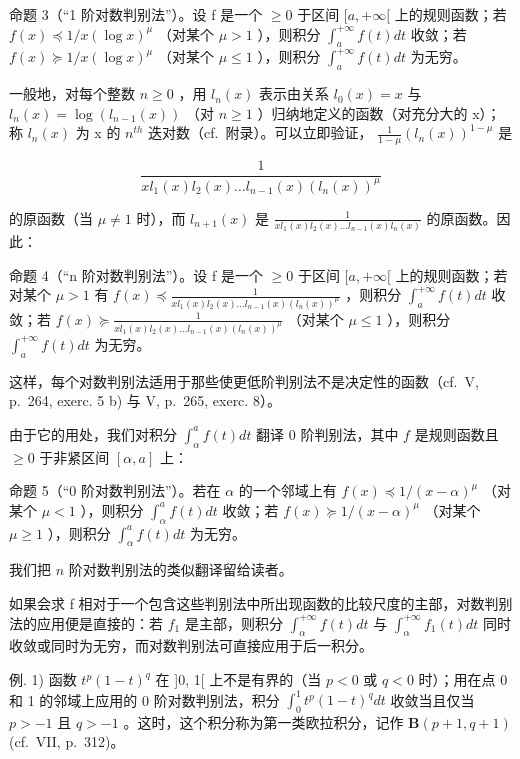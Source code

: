 命题 3（``1 阶对数判别法''）。设 f 是一个 \(\geqslant 0\) 于区间 \([a, +\infty[\) 上的规则函数；若 \(f(x) \preccurlyeq 1/x(\log x)^{\mu}\) （对某个 \(\mu > 1\) ），则积分 \(\int_{a}^{+\infty} f(t) dt\) 收敛；若 \(f(x) \succcurlyeq 1/x(\log x)^{\mu}\) （对某个 \(\mu \leqslant 1\) ），则积分 \(\int_{a}^{+\infty} f(t) dt\) 为无穷。

一般地，对每个整数 \(n \geqslant 0\) ，用 \(l_{n}(x)\) 表示由关系 \(l_{0}(x) = x\) 与 \(l_{n}(x) = \log(l_{n-1}(x))\) （对 \(n \geqslant 1\) ）归纳地定义的函数（对充分大的 x）；称 \(l_{n}(x)\) 为 x 的 \(n^{th}\) 迭对数（cf.~附录）。可以立即验证， \(\frac{1}{1 - \mu}\left(l_{n}(x)\right)^{1 - \mu}\) 是

\[
\frac {1}{x l _ {1} (x) l _ {2} (x) \dots l _ {n - 1} (x) \left(l _ {n} (x)\right) ^ {\mu}}
\]

的原函数（当 \(\mu \neq 1\) 时），而 \(l_{n+1}(x)\) 是 \(\frac{1}{xl_1(x)l_2(x)\ldots l_{n-1}(x)l_n(x)}\) 的原函数。因此：

命题 4（``n 阶对数判别法''）。设 f 是一个 \(\geqslant0\) 于区间 \([a,+\infty[\) 上的规则函数；若对某个 \(\mu>1\) 有 \(f(x)\preccurlyeq\frac{1}{xl_{1}(x)l_{2}(x)\ldots l_{n-1}(x)(l_{n}(x))^{\mu}}\) ，则积分 \(\int_{a}^{+\infty}f(t)dt\) 收敛；若 \(f(x)\succcurlyeq\frac{1}{xl_{1}(x)l_{2}(x)\ldots l_{n-1}(x)(l_{n}(x))^{\mu}}\) （对某个 \(\mu\leqslant1\) ），则积分 \(\int_{a}^{+\infty}f(t)dt\) 为无穷。

这样，每个对数判别法适用于那些使更低阶判别法不是决定性的函数（cf.~V, p.~264, exerc. 5 b) 与 V, p.~265, exerc. 8）。

由于它的用处，我们对积分 \(\int_{\alpha}^{a}f(t)dt\) 翻译 0 阶判别法，其中 \(f\) 是规则函数且 \(\geqslant 0\) 于非紧区间 \([\alpha ,a]\) 上：

命题 5（``0 阶对数判别法''）。若在 \(\alpha\) 的一个邻域上有 \(f(x) \preccurlyeq 1/(x - \alpha)^{\mu}\) （对某个 \(\mu < 1\) ），则积分 \(\int_{\alpha}^{a} f(t) dt\) 收敛；若 \(f(x) \succcurlyeq 1/(x - \alpha)^{\mu}\) （对某个 \(\mu \geqslant 1\) ），则积分 \(\int_{\alpha}^{a} f(t) dt\) 为无穷。

我们把 \(n\) 阶对数判别法的类似翻译留给读者。

如果会求 f 相对于一个包含这些判别法中所出现函数的比较尺度的主部，对数判别法的应用便是直接的：若 \(f_{1}\) 是主部，则积分 \(\int_{\alpha}^{+\infty} f(t) dt\) 与 \(\int_{\alpha}^{+\infty} f_{1}(t) dt\) 同时收敛或同时为无穷，而对数判别法可直接应用于后一积分。

例. 1) 函数 \(t^p (1 - t)^q\) 在 {]}0, 1{[} 上不是有界的（当 \(p < 0\) 或 \(q < 0\) 时）；用在点 0 和 1 的邻域上应用的 0 阶对数判别法，积分 \(\int_0^1 t^p (1 - t)^q dt\) 收敛当且仅当 \(p > -1\) 且 \(q > -1\) 。这时，这个积分称为第一类欧拉积分，记作 \(\mathbf{B}(p + 1,q + 1)\) (cf.~VII, p.~312)。

